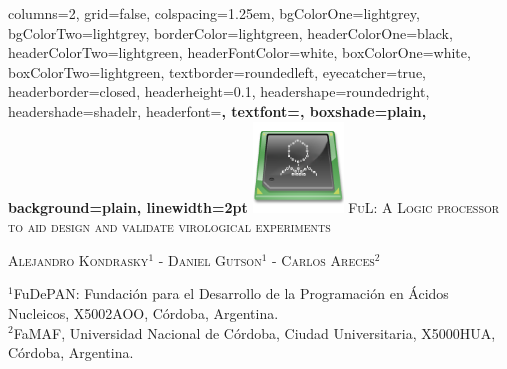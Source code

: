 \documentclass[portrait,final,a0paper,fontscale=0.277]{baposter}
\begin{document}
\begin{poster}%
  {
  columns=2,
  grid=false,
  colspacing=1.25em,
  bgColorOne=lightgrey,
  bgColorTwo=lightgrey,
  borderColor=lightgreen,
  headerColorOne=black,
  headerColorTwo=lightgreen,
  headerFontColor=white,
  boxColorOne=white,
  boxColorTwo=lightgreen,
  textborder=roundedleft,
  eyecatcher=true,
  headerborder=closed,
  headerheight=0.1\textheight,
  headershape=roundedright,
  headershade=shadelr,
  headerfont=\Large\bf\textsc, %
  textfont={\setlength{\parindent}{1.5em}},
  boxshade=plain,
  background=plain,
  linewidth=2pt
  }
  {
  	\includegraphics[height=6.5em]{ful_logo}
  }
  {
  \LARGE
  \textsc{FuL: A Logic processor to aid design and validate virological experiments}\vspace{0.5em}
  }
  {
  	\textsc{Alejandro Kondrasky$^{1}$ - Daniel Gutson$^{1}$ - Carlos Areces$^{2}$}
    \footnotesize{
    \begin{flushleft}
	\hspace{1.5em}$^1$FuDePAN: Fundación para el Desarrollo de la Programación en Ácidos Nucleicos, X5002AOO, Córdoba, Argentina.\\
    \hspace{1.5em}$^2$FaMAF, Universidad Nacional de Córdoba, Ciudad Universitaria, X5000HUA, Córdoba, Argentina.\\
	\end{flushleft}
    }
  }		
  {%
	\begin{minipage}{12em}

\end{minipage}}
\end{poster}
\end{document}
